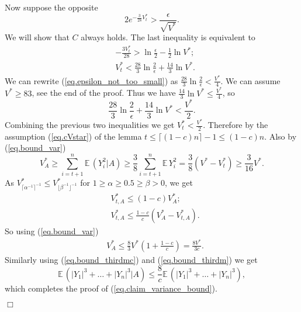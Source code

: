 \documentclass{article}
\newenvironment{proofof}[1]{\noindent {\bf Proof of #1}}{\hspace*{\fill}$\Box$}
\def\E{{\mathbb E}\,}
\begin{document}
\begin{proofof}{Lemma~\ref{lem.clt}}
    Now suppose the opposite 
    \[
        2 e^{-\frac 3 {28} V_{t}^*} >  \frac {\epsilon} {\sqrt{V^*}}.
    \]
    We will show that $C$ always holds.
    The last inequality is equivalent to
    \begin{align*}
        & -\frac {3 V_{t}^*} {28} > \ln \frac \epsilon 2 - \frac 1 2 \ln V^*; \\ & V_{t}^* < \frac {28} 3 \ln \frac 2 \epsilon + \frac {14} 3 \ln V^*. \end{align*}
    We can rewrite (\ref{eq.epsilon_not_too_small}) as
$\frac {28} 3 \ln \frac 2 \epsilon < \frac {V^*} 4$. 
        We can assume $V^* \ge 83$, see the end of the proof. Thus we have $\frac {14} 3 \ln V^*  \le \frac {V^*} 4$, so
        \begin{equation*} \frac {28} 3 \ln \frac 2 \epsilon  + \frac {14} 3 \ln V^* < \frac {V^*} 2.
        \end{equation*} 
Combining the previous two inequalities we get $V_{t}^* < \frac {V^*} 2$.
        Therefore by the assumption (\ref{eq.cVstar}) of the lemma $t \le \lceil (1-c) n \rceil - 1 \le (1-c) n$.  
        Also by (\ref{eq.bound_var})
    \[
        V_{A}^* \ge \sum_{i=t+1}^n \E (Y_i^2 | A) \ge \frac 3 8 \sum_{i=t+1}^n \E Y_i^2 = \frac 3 8 (V^* - V_{t}^*) \ge \frac 3 {16} V^*.
    \]
    As $V_{\lceil \alpha^{-1} \rceil^{-1}}^* \le V_{\lfloor \beta^{-1} \rfloor^{-1}}^*$
    for $1 \ge \alpha \ge 0.5 \ge \beta > 0$, we get
\begin{align*}
        &V_{t,A}^* \le (1-c) V_{A}^*;\\
        &V_{t,A}^* \le \frac {1-c} c (V_{A}^* - V_{t,A}^*).
    \end{align*}
    So using (\ref{eq.bound_var})
    \begin{align*}
        &V_{A}^* \le \frac 8 3 V^* (1 + \frac {1-c} c) = \frac {8 V^*} {3c}.
    \end{align*}
    Similarly using (\ref{eq.bound_thirdmc}) and  (\ref{eq.bound_thirdm}) we get
    \[
        \E(|Y_1|^3 + \dots + |Y_n|^3 | A) \le \frac 8 c \E(|Y_1|^3 + \dots + |Y_n|^3),
    \]
    which completes the proof of (\ref{eq.claim_variance_bound}).



\end{proofof}
\end{document}
